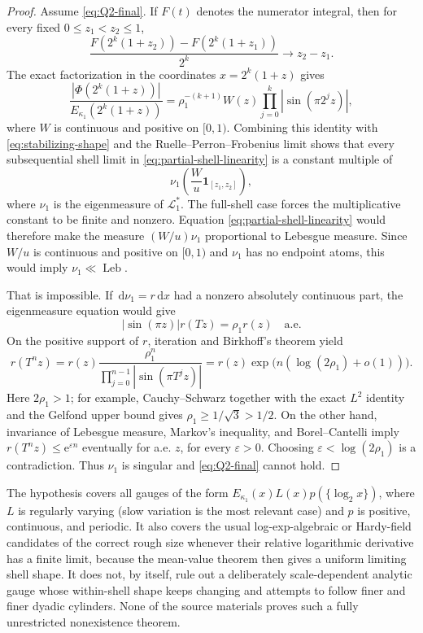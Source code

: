 \documentclass[11pt,oneside]{article}
\theoremstyle{definition}
\theoremstyle{remark}
\newcommand{\e}{\mathrm e}
\newcommand{\dd}{\,\mathrm d}
\begin{document}
\begin{proof}
Assume \eqref{eq:Q2-final}.  If $F(t)$ denotes the numerator integral, then for every fixed
$0\le z_1<z_2\le1$,
\begin{equation}
 \frac{F(2^k(1+z_2))-F(2^k(1+z_1))}{2^k}\longrightarrow z_2-z_1.
 \label{eq:partial-shell-linearity}
\end{equation}
The exact factorization in the coordinates $x=2^k(1+z)$ gives
\[
 \frac{|\Phi(2^k(1+z))|}{E_{\kappa_1}(2^k(1+z))}
 =\rho_1^{-(k+1)}W(z)\prod_{j=0}^{k}|\sin(\pi2^jz)|,
\]
where $W$ is continuous and positive on $[0,1)$.  Combining this identity with
\eqref{eq:stabilizing-shape} and the Ruelle--Perron--Frobenius limit shows that every
subsequential shell limit in \eqref{eq:partial-shell-linearity} is a constant multiple of
\[
 \nu_1\!\left(\frac{W}{u}\mathbf1_{[z_1,z_2]}\right),
\]
where $\nu_1$ is the eigenmeasure of $\mathcal L_1^*$.  The full-shell case forces the
multiplicative constant to be finite and nonzero.  Equation
\eqref{eq:partial-shell-linearity} would therefore make the measure
$(W/u)\nu_1$ proportional to Lebesgue measure.  Since $W/u$ is continuous and positive on
$[0,1)$ and $\nu_1$ has no endpoint atoms, this would imply $\nu_1\ll\operatorname{Leb}$.

That is impossible.  If $\dd\nu_1=r\dd x$ had a nonzero absolutely continuous part, the
eigenmeasure equation would give
\begin{equation}
 |\sin(\pi z)|r(Tz)=\rho_1r(z)
 \quad\text{a.e.}
 \label{eq:conformal-density-final}
\end{equation}
On the positive support of $r$, iteration and Birkhoff's theorem yield
\[
 r(T^nz)=r(z)\frac{\rho_1^n}
 {\prod_{j=0}^{n-1}|\sin(\pi T^jz)|}
 =r(z)\exp\bigl(n(\log(2\rho_1)+o(1))\bigr).
\]
Here $2\rho_1>1$; for example, Cauchy--Schwarz together with the exact $L^2$ identity and
the Gelfond upper bound gives $\rho_1\ge1/\sqrt3>1/2$.  On the other hand, invariance of
Lebesgue measure, Markov's inequality, and Borel--Cantelli imply
$r(T^nz)\le\e^{\varepsilon n}$ eventually for a.e. $z$, for every $\varepsilon>0$.
Choosing $\varepsilon<\log(2\rho_1)$ is a contradiction.  Thus $\nu_1$ is singular and
\eqref{eq:Q2-final} cannot hold.
\end{proof}

The hypothesis covers all gauges of the form
$E_{\kappa_1}(x)L(x)p(\{\log_2x\})$, where $L$ is regularly varying (slow variation is the
most relevant case) and $p$ is positive, continuous, and periodic.  It also covers the
usual log-exp-algebraic or Hardy-field candidates of the correct rough size whenever their
relative logarithmic derivative has a finite limit, because the mean-value theorem then
gives a uniform limiting shell shape.  It does not, by itself, rule out a deliberately
scale-dependent analytic gauge whose within-shell shape keeps changing and attempts to
follow finer and finer dyadic cylinders.  None of the
source materials proves such a fully unrestricted nonexistence theorem.
\end{document}
